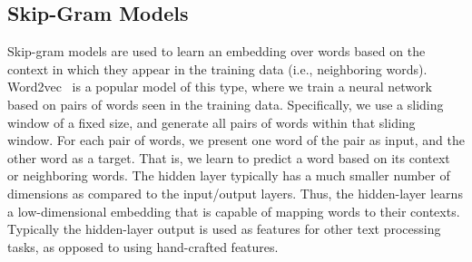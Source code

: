 \subsection{Skip-Gram Models}

Skip-gram models are used to learn an embedding over words based on the context in which they appear in the training data (i.e., neighboring words). Word2vec~\cite{mikolov&al13} is a popular model of this type, where we train a neural network based on pairs of words seen in the training data. Specifically, we use a sliding window of a fixed size, and generate all pairs of words within that sliding window. For each pair of words, we present one word of the pair as input, and the other word as a target. That is, we learn to predict a word based on its context or neighboring words. The hidden layer typically has a much smaller number of dimensions as compared to the input/output layers. Thus, the hidden-layer learns a low-dimensional embedding that is capable of mapping words to their contexts. Typically the hidden-layer output is used as features for other text processing tasks, as opposed to using hand-crafted features.